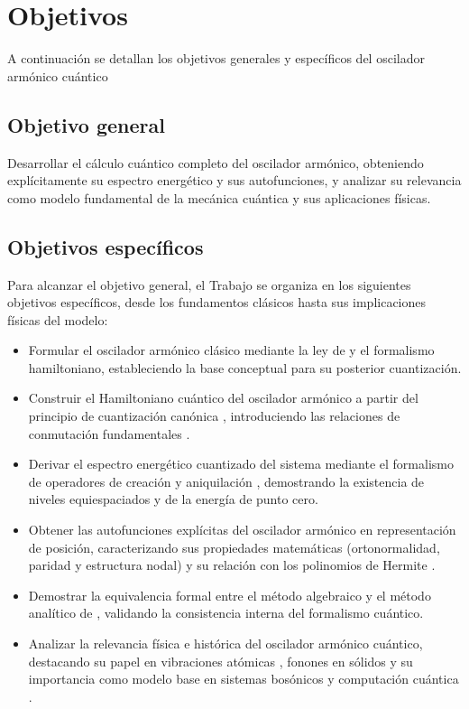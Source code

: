 \chapter{Objetivos}
\vspace{-30pt}
A continuación se detallan los objetivos generales y específicos del oscilador armónico cuántico
\section{Objetivo general}
Desarrollar el cálculo cuántico completo del oscilador armónico, obteniendo explícitamente su espectro energético y sus autofunciones, y analizar su relevancia como modelo fundamental de la mecánica cuántica y sus aplicaciones físicas.
\section{Objetivos específicos}
Para alcanzar el objetivo general, el Trabajo se organiza en los siguientes objetivos específicos, desde los fundamentos clásicos hasta sus implicaciones físicas del modelo:
\begin{itemize}
    \item Formular el oscilador armónico clásico mediante la ley de  \cite{hooke1678} y el formalismo hamiltoniano, estableciendo la base conceptual para su posterior cuantización.
    \item Construir el Hamiltoniano cuántico del oscilador armónico a partir del principio de cuantización canónica , introduciendo las relaciones de conmutación fundamentales \citep{born1925}.
    \item Derivar el espectro energético cuantizado del sistema mediante el formalismo de operadores de creación y aniquilación \citep{dirac1930}, demostrando la existencia de niveles equiespaciados y de la energía de punto cero.
    \item Obtener las autofunciones explícitas del oscilador armónico en representación de posición, caracterizando sus propiedades matemáticas (ortonormalidad, paridad y estructura nodal) y su relación con los polinomios de Hermite \citep{schrodinger1926b}.
    \item Demostrar la equivalencia formal entre el método algebraico \cite{dirac1930} y el método analítico de  \cite{schrodinger1926b}, validando la consistencia interna del formalismo cuántico.
    \item Analizar la relevancia física e histórica del oscilador armónico cuántico, destacando su papel en vibraciones atómicas \citep{einstein1907, debye1912}, fonones en sólidos y su importancia como modelo base en sistemas bosónicos y computación cuántica \citep{cai2021bosonic, campagne2020quantum}.
\end{itemize}